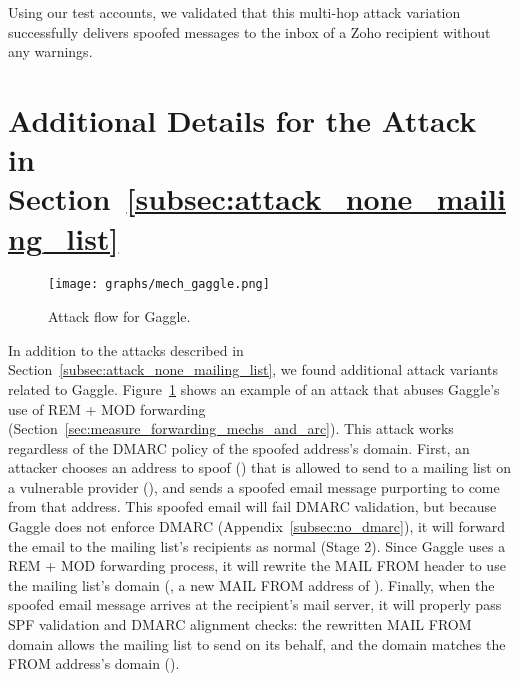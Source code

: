 Using our test accounts, we validated that this multi-hop attack variation
successfully delivers spoofed messages to the inbox of a Zoho recipient
without any warnings.






\section{Additional Details for the Attack in Section~\ref{subsec:attack_none_mailing_list}}
\label{sec:append_mailing_list_details}


\begin{figure}[t]
\centering
\texttt{[image: graphs/mech\_gaggle.png]}
\centering
\caption{Attack flow for Gaggle.}
\label{fig:gaggle_email_mech}
\end{figure}

In addition to the attacks described in
Section~\ref{subsec:attack_none_mailing_list}, we found
additional attack variants related to Gaggle.
Figure~\ref{fig:gaggle_email_mech} shows an example of an attack that
abuses Gaggle's use of REM + MOD forwarding
(Section~\ref{sec:measure_forwarding_mechs_and_arc}). This attack works
regardless of the DMARC policy of the spoofed address's domain.  First, an
attacker chooses an address to spoof () that is
allowed to send to a mailing list on a vulnerable provider
(), and sends a spoofed email message
purporting to come from that address.  This spoofed email will fail
DMARC validation, but because Gaggle does not enforce DMARC
(Appendix~\ref{subsec:no_dmarc}), it will forward the email to the
mailing list's recipients as normal (Stage 2).  Since Gaggle uses a
REM + MOD forwarding process, it will rewrite the \textsc{MAIL FROM}
header to use the mailing list's domain (\eg, a
new \textsc{MAIL FROM} address of ).
Finally, when the spoofed email message arrives at the recipient's mail server,
it will properly pass SPF validation and DMARC alignment checks:
the rewritten \textsc{MAIL FROM} domain allows the mailing list to send on its behalf, and the domain matches the \textsc{FROM} address's domain ().


